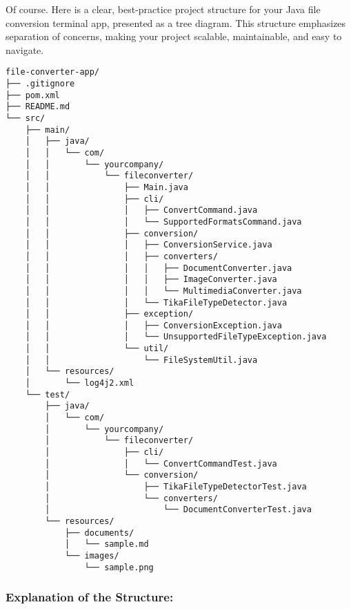 Of course. Here is a clear, best-practice project structure for your
Java file conversion terminal app, presented as a tree diagram. This
structure emphasizes separation of concerns, making your project
scalable, maintainable, and easy to navigate.

\begin{verbatim}
file-converter-app/
├── .gitignore
├── pom.xml
├── README.md
└── src/
    ├── main/
    │   ├── java/
    │   │   └── com/
    │   │       └── yourcompany/
    │   │           └── fileconverter/
    │   │               ├── Main.java
    │   │               ├── cli/
    │   │               │   ├── ConvertCommand.java
    │   │               │   └── SupportedFormatsCommand.java
    │   │               ├── conversion/
    │   │               │   ├── ConversionService.java
    │   │               │   ├── converters/
    │   │               │   │   ├── DocumentConverter.java
    │   │               │   │   ├── ImageConverter.java
    │   │               │   │   └── MultimediaConverter.java
    │   │               │   └── TikaFileTypeDetector.java
    │   │               ├── exception/
    │   │               │   ├── ConversionException.java
    │   │               │   └── UnsupportedFileTypeException.java
    │   │               └── util/
    │   │                   └── FileSystemUtil.java
    │   └── resources/
    │       └── log4j2.xml
    └── test/
        ├── java/
        │   └── com/
        │       └── yourcompany/
        │           └── fileconverter/
        │               ├── cli/
        │               │   └── ConvertCommandTest.java
        │               └── conversion/
        │                   ├── TikaFileTypeDetectorTest.java
        │                   └── converters/
        │                       └── DocumentConverterTest.java
        └── resources/
            ├── documents/
            │   └── sample.md
            └── images/
                └── sample.png
\end{verbatim}

\subsubsection{\texorpdfstring{\textbf{Explanation of the
Structure:}}{Explanation of the Structure:}}\label{explanation-of-the-structure}

